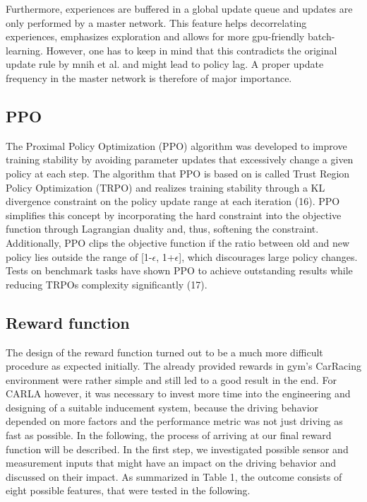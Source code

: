 \documentclass[letterpaper, 10 pt, conference]{ieeeconf}  %
\begin{document}
Furthermore, experiences are buffered in a global update 
queue and updates are only performed by a master network. This feature helps decorrelating experiences, emphasizes exploration and allows for more gpu-friendly
batch-learning. However, one has to keep in mind that this contradicts the original update rule by mnih et al. and might lead to policy lag. A proper update 
frequency in the master network is therefore of major importance.

\subsection{PPO}

The Proximal Policy Optimization (PPO) algorithm was developed to improve training stability by avoiding parameter updates that excessively change a given policy at each step. The algorithm that PPO is based on is called Trust Region Policy Optimization (TRPO) and realizes training stability through a KL divergence constraint on the policy update range at each iteration (16). PPO simplifies this concept by incorporating the hard constraint into the objective function through Lagrangian duality and, thus, softening the constraint. Additionally, PPO clips the objective function if the ratio between old and new policy lies outside the range of [1-$\epsilon$, 1+$\epsilon$], which discourages large policy changes. Tests on benchmark tasks have shown PPO to achieve outstanding results while reducing TRPOs complexity significantly (17).

\subsection{Reward function}
The design of the reward function turned out to be a much more difficult procedure as expected initially. The already provided rewards in gym's CarRacing environment were rather simple and still led to a good result in the end. For CARLA however, it was necessary to invest more time into the engineering and designing of a suitable inducement system, because the driving behavior depended on more factors and the performance metric was not just driving as fast as possible. In the following, the process of arriving at our final reward function will be described. \newline 
In the first step, we investigated possible sensor and measurement inputs that might have an impact on the driving behavior and discussed on their impact. As summarized in Table 1, the outcome consists of eight possible features, that were tested in the following.
\end{document}
